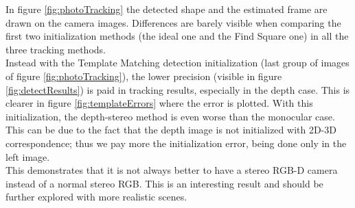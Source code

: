 In figure \ref{fig:photoTracking} the detected shape and the estimated frame are drawn on the camera images. Differences are barely visible when comparing the first two initialization methods (the ideal one and the Find Square one) in all the three tracking methods.\\

Instead with the Template Matching detection initialization (last group of images of figure \ref{fig:photoTracking}), the lower precision (visible in figure \ref{fig:detectResults}) is paid in tracking results, especially in the depth case. This is clearer in figure \ref{fig:templateErrors} where the error is plotted. With this initialization, the depth-stereo method is even worse than the monocular case.\\
This can be due to the fact that the depth image is not initialized with 2D-3D correspondence; thus we pay more the initialization error, being done only in the left image.\\
This demonstrates that it is not always better to have a stereo RGB-D camera instead of a normal stereo RGB. This is an interesting result and should be further explored with more realistic scenes.\\

